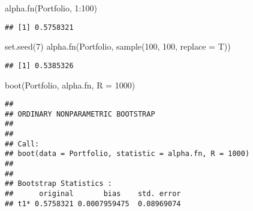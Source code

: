 \documentclass[
]{article}
\newenvironment{Shaded}{\begin{snugshade}}{\end{snugshade}}
\newcommand{\AttributeTok}[1]{\textcolor[rgb]{0.77,0.63,0.00}{#1}}
\newcommand{\ControlFlowTok}[1]{\textcolor[rgb]{0.13,0.29,0.53}{\textbf{#1}}}
\newcommand{\DecValTok}[1]{\textcolor[rgb]{0.00,0.00,0.81}{#1}}
\newcommand{\FunctionTok}[1]{\textcolor[rgb]{0.00,0.00,0.00}{#1}}
\newcommand{\NormalTok}[1]{#1}
\newcommand{\OtherTok}[1]{\textcolor[rgb]{0.56,0.35,0.01}{#1}}
\newcommand{\SpecialCharTok}[1]{\textcolor[rgb]{0.00,0.00,0.00}{#1}}
\begin{document}
\begin{Shaded}
\end{Shaded}

\begin{Shaded}
\begin{Highlighting}[]
\FunctionTok{alpha.fn}\NormalTok{(Portfolio, }\DecValTok{1}\SpecialCharTok{:}\DecValTok{100}\NormalTok{)}
\end{Highlighting}
\end{Shaded}

\begin{verbatim}
## [1] 0.5758321
\end{verbatim}

\begin{Shaded}
\begin{Highlighting}[]
\FunctionTok{set.seed}\NormalTok{(}\DecValTok{7}\NormalTok{)}
\FunctionTok{alpha.fn}\NormalTok{(Portfolio, }\FunctionTok{sample}\NormalTok{(}\DecValTok{100}\NormalTok{, }\DecValTok{100}\NormalTok{, }\AttributeTok{replace =}\NormalTok{ T))}
\end{Highlighting}
\end{Shaded}

\begin{verbatim}
## [1] 0.5385326
\end{verbatim}

\begin{Shaded}
\begin{Highlighting}[]
\FunctionTok{boot}\NormalTok{(Portfolio, alpha.fn, }\AttributeTok{R =} \DecValTok{1000}\NormalTok{)}
\end{Highlighting}
\end{Shaded}

\begin{verbatim}
## 
## ORDINARY NONPARAMETRIC BOOTSTRAP
## 
## 
## Call:
## boot(data = Portfolio, statistic = alpha.fn, R = 1000)
## 
## 
## Bootstrap Statistics :
##      original       bias    std. error
## t1* 0.5758321 0.0007959475  0.08969074
\end{verbatim}
\end{document}
